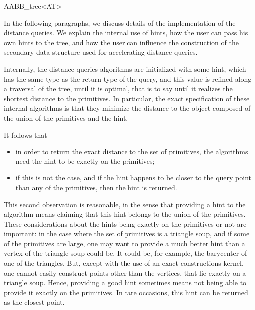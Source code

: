 \begin{ccRefClass}{AABB_tree<AT>}



\begin{ccAdvanced}
In the following paragraphs, we discuss details of the implementation of the distance queries. We explain the internal use of hints, how the user can pass his own hints to the tree, and how the user can influence the construction of the secondary data structure used for accelerating distance queries.

Internally, the distance queries algorithms are initialized with some hint, which has the same type as the return type of the query, and this value is refined along a traversal of the tree, until it is optimal, that is to say until it realizes the shortest distance to the primitives. In particular, the exact specification of these internal algorithms is that they minimize the distance  to the object composed of the union of the primitives and the hint. 

It follows that 
\begin{itemize}
\item in order to return the exact distance to the set of primitives, the algorithms need the hint to be exactly on the primitives;
\item if this is not the case, and if the hint happens to be closer to the query point than any of the primitives, then the hint is returned.
\end{itemize}
This second observation is reasonable, in the sense that providing a hint to the algorithm means claiming that this hint belongs to the union of the primitives. These considerations about the hints being exactly on the primitives or not are important: in the case where the set of primitives is a triangle soup, and if some of the primitives are large, one may want to provide a much better hint than a vertex of the triangle soup could be. It could be, for example, the barycenter of one of the triangles. But, except with the use of an exact constructions kernel, one cannot easily construct points other than the vertices, that lie exactly on a triangle soup. Hence, providing a good hint sometimes means not being able to provide it exactly on the primitives. In rare occasions, this hint can be returned as the closest point.


\end{ccAdvanced}
\end{ccRefClass}
